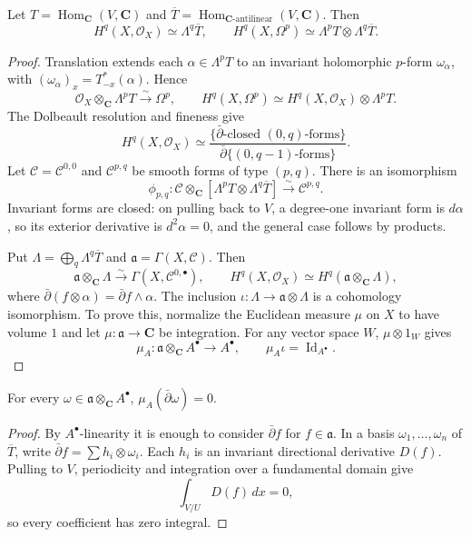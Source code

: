 \begin{theorem}
\label{mumford-frag-dolbeault}
Let $T=\operatorname{Hom}_{\mathbf C}(V,\mathbf C)$ and
$\overline T=\operatorname{Hom}_{\mathbf C\text{-antilinear}}(V,\mathbf C)$.
Then
\[
 H^q(X,\mathcal O_X)\simeq\Lambda^q\overline T,
 \qquad
 H^q(X,\Omega^p)\simeq\Lambda^pT\otimes\Lambda^q\overline T.
\]
\end{theorem}
\begin{proof}
Translation extends each $\alpha\in\Lambda^pT$ to an invariant holomorphic
$p$-form $\omega_\alpha$, with
$(\omega_\alpha)_x=T_{-x}^*(\alpha)$.  Hence
\[
 \mathcal O_X\otimes_{\mathbf C}\Lambda^pT\xrightarrow{\sim}\Omega^p,
 \qquad
 H^q(X,\Omega^p)\simeq H^q(X,\mathcal O_X)\otimes\Lambda^pT.
\]
The Dolbeault resolution and fineness give
\[
 H^q(X,\mathcal O_X)\simeq
 \frac{\{\bar\partial\text{-closed $(0,q)$-forms}\}}
 {\bar\partial\{\text{$(0,q-1)$-forms}\}}.
\]
Let $\mathcal C=\mathcal C^{0,0}$ and
$\mathcal C^{p,q}$ be smooth forms of type $(p,q)$.  There is an isomorphism
\[
 \phi_{p,q}:\mathcal C\otimes_{\mathbf C}
 [\Lambda^pT\otimes\Lambda^q\overline T]\xrightarrow{\sim}\mathcal C^{p,q}.
\]
Invariant forms are closed: on pulling back to $V$, a degree-one invariant
form is $d\alpha$, so its exterior derivative is $d^2\alpha=0$, and the
general case follows by products.

Put $\Lambda=\bigoplus_q\Lambda^q\overline T$ and
$\mathfrak a=\Gamma(X,\mathcal C)$.  Then
\[
 \mathfrak a\otimes_{\mathbf C}\Lambda\xrightarrow{\sim}
 \Gamma(X,\mathcal C^{0,\bullet}),
 \qquad H^q(X,\mathcal O_X)\simeq H^q(\mathfrak a\otimes_{\mathbf C}\Lambda),
\]
where $\bar\partial(f\otimes\alpha)=\bar\partial f\wedge\alpha$.
The inclusion $\iota:\Lambda\to\mathfrak a\otimes\Lambda$ is a cohomology
isomorphism.  To prove this, normalize the Euclidean measure $\mu$ on $X$
to have volume $1$ and let $\mu:\mathfrak a\to\mathbf C$ be integration.
For any vector space $W$, $\mu\otimes1_W$ gives
\[
 \mu_A:\mathfrak a\otimes_{\mathbf C}A^\bullet\to A^\bullet,
 \qquad \mu_A\iota=\operatorname{Id}_{A^\bullet}.
\]
\end{proof}

\begin{lemma}
\label{mumford-frag-integration-lemma}
For every $\omega\in\mathfrak a\otimes_{\mathbf C}A^\bullet$,
$\mu_A(\bar\partial\omega)=0$.
\end{lemma}
\begin{proof}
By $A^\bullet$-linearity it is enough to consider $\bar\partial f$ for
$f\in\mathfrak a$.  In a basis $\omega_1,\ldots,\omega_n$ of $\overline T$,
write $\bar\partial f=\sum h_i\otimes\omega_i$.  Each $h_i$ is an invariant
directional derivative $D(f)$.  Pulling to $V$, periodicity and integration
over a fundamental domain give
\[
 \int_{V/U}D(f)\,dx=0,
\]
so every coefficient has zero integral.
\end{proof}

